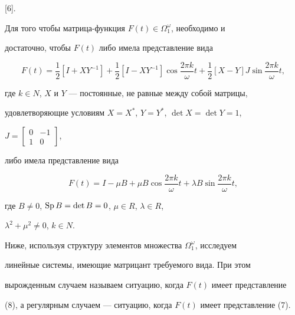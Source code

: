 [6]. 


 


 


\begin{thm} 


Для того чтобы матрица-функция $F(t)\in\Omega^\omega_1$, необходимо и 


достаточно, чтобы $F(t)$ либо имела представление вида 


\begin{equation} 


F(t)=\frac{1}{2}[I+XY^{-1}]+\frac{1}{2}[I-XY^{-1}] 


\cos\frac{2\pi k}{\omega}t+\frac{1}{2}[X-Y]J\sin 


\frac{2\pi k}{\omega}t, 


\end{equation} 


где $k\in N$, $X$ и $Y$ --- постоянные, не равные между собой матрицы, 


удовлетворяющие условиям $X=X^*$, $Y=Y^*$, $\det X=\det Y=1$, 


$J=\left[\begin{smallmatrix}0&-1\\1&0\end{smallmatrix}\right]$, 


либо имела представление вида 


\begin{equation} 


F(t)=I-\mu B+\mu B\cos\frac{2\pi k}{\omega}t+\lambda B 


\sin\frac{2\pi k}{\omega}t, 


\end{equation} 


где $B\ne0$, $\operatorname{Sp} B=\det B=0$, $\mu\in R$, $\lambda\in R$, 


$\lambda^2+\mu^2\ne0$, $k\in N$. 


\end{thm} 


 


 


Ниже, используя структуру элементов множества $\Omega^\omega_1$, исследуем 


линейные системы, имеющие матрицант требуемого вида. При этом 


вырожденным случаем называем ситуацию, когда $F(t)$ имеет представление 


(8), а регулярным случаем --- ситуацию, когда $F(t)$ имеет представление (7). 



